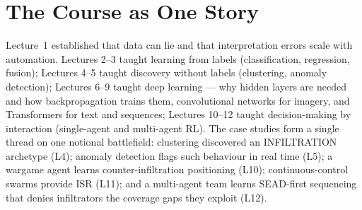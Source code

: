 \documentclass[11pt]{article}
\begin{document}
\tableofcontents
\newpage

\section{The Course as One Story}
Lecture~1 established that data can lie and that interpretation errors scale with automation. Lectures 2--3 taught learning from labels (classification, regression, fusion); Lectures 4--5 taught discovery without labels (clustering, anomaly detection); Lectures 6--9 taught deep learning --- why hidden layers are needed and how backpropagation trains them, convolutional networks for imagery, and Transformers for text and sequences; Lectures 10--12 taught decision-making by interaction (single-agent and multi-agent RL). The case studies form a single thread on one notional battlefield: clustering discovered an INFILTRATION archetype (L4); anomaly detection flags such behaviour in real time (L5); a wargame agent learns counter-infiltration positioning (L10); continuous-control swarms provide ISR (L11); and a multi-agent team learns SEAD-first sequencing that denies infiltrators the coverage gaps they exploit (L12).
\end{document}
